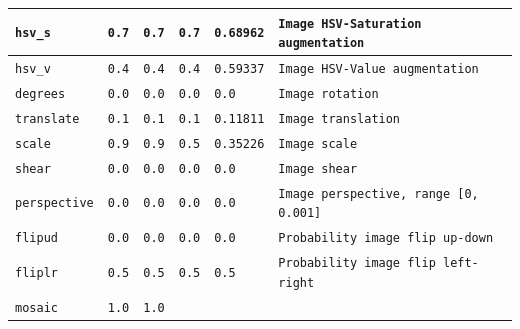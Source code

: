 \begin{table}
\begin{tabular}{ | m{7.5em} | m{4em} | m{4em} | 
 m{4em}| m{4em} | m{16em} |}
            \tabularnewline
        \hline
            \texttt{hsv\_s} & 
            \centering\texttt{0.7} & 
            \centering\texttt{0.7} & 
            \centering\texttt{0.7} & 
            \centering\texttt{0.68962} &
            \texttt{Image HSV-Saturation augmentation}
            \tabularnewline
        \hline
            \texttt{hsv\_v} & 
            \centering\texttt{0.4} & 
            \centering\texttt{0.4} & 
            \centering\texttt{0.4} & 
            \centering\texttt{0.59337} &
            \texttt{Image HSV-Value augmentation}
            \tabularnewline
        \hline
            \texttt{degrees} & 
            \centering\texttt{0.0} & 
            \centering\texttt{0.0} & 
            \centering\texttt{0.0} & 
            \centering\texttt{0.0} &
            \texttt{Image rotation}
            \tabularnewline
        \hline
            \texttt{translate} & 
            \centering\texttt{0.1} & 
            \centering\texttt{0.1} & 
            \centering\texttt{0.1} & 
            \centering\texttt{0.11811} &
            \texttt{Image translation}
            \tabularnewline
        \hline
            \texttt{scale} & 
            \centering\texttt{0.9} & 
            \centering\texttt{0.9} & 
            \centering\texttt{0.5} & 
            \centering\texttt{0.35226} &
            \texttt{Image scale}
            \tabularnewline
        \hline
            \texttt{shear} & 
            \centering\texttt{0.0} & 
            \centering\texttt{0.0} & 
            \centering\texttt{0.0} & 
            \centering\texttt{0.0} &
            \texttt{Image shear}
            \tabularnewline
        \hline
            \texttt{perspective} & 
            \centering\texttt{0.0} & 
            \centering\texttt{0.0} & 
            \centering\texttt{0.0} & 
            \centering\texttt{0.0} &
            \texttt{Image perspective, range [0, 0.001]}
            \tabularnewline
        \hline
            \texttt{flipud} & 
            \centering\texttt{0.0} & 
            \centering\texttt{0.0} & 
            \centering\texttt{0.0} & 
            \centering\texttt{0.0} &
            \texttt{Probability image flip up-down}
            \tabularnewline
        \hline
            \texttt{fliplr} & 
            \centering\texttt{0.5} & 
            \centering\texttt{0.5} & 
            \centering\texttt{0.5} & 
            \centering\texttt{0.5} &
            \texttt{Probability image flip left-right}
            \tabularnewline
        \hline
            \texttt{mosaic} & 
            \centering\texttt{1.0} & 
            \centering\texttt{1.0} & 

\end{tabular}
\end{table}

